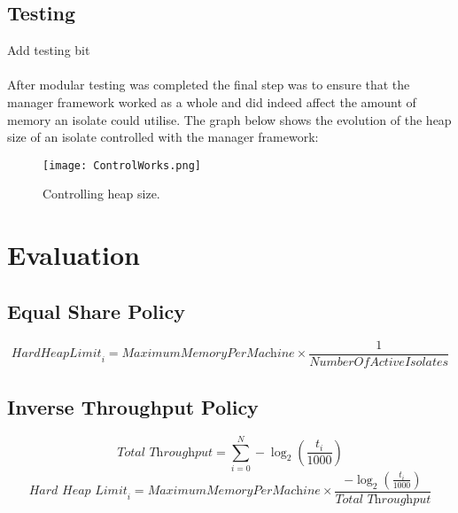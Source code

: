 \documentclass{l4proj}
\begin{document}
\section{Testing}
Add testing bit
\\\\
\hspace*{3em} After modular testing was completed the final step was to ensure that the manager framework worked as a whole and did indeed affect the amount of memory an isolate could utilise. The graph below shows the evolution of the heap size of an isolate controlled with the manager framework:
\begin{figure}[!ht]
  \centering
    \texttt{[image: ControlWorks.png]}
  \caption{Controlling heap size.}
\end{figure}

\chapter{Evaluation}
\section{Equal Share Policy}
\begin{equation}
\textit{HardHeapLimit}_i = \textit{MaximumMemoryPerMachine} \times \frac{1}{\textit{NumberOfActiveIsolates}}
\end{equation}
\section{Inverse Throughput Policy}
\begin{equation}
\textit{Total Throughput} = \sum_{i=0}^{N} -\log_2(\frac{t_i}{1000})
\end{equation}
\begin{equation}
\textit{Hard Heap Limit}_i = \textit{MaximumMemoryPerMachine} \times \frac{-\log_2(\frac{t_i}{1000})}{\textit{Total Throughput}}
\end{equation}
\end{document}
